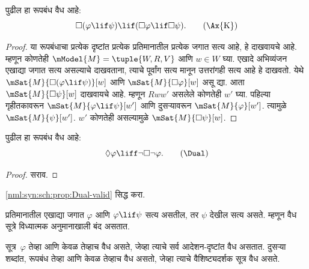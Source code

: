 \begin{prop}\label{nml:syn:sch:prop:Kvalid}
  पुढील  हा रूपबंध वैध आहे:
  \begin{equation*}
  \Box(\varphi \lif \psi) \lif (\Box \varphi \lif \Box \psi). \tag{\Ax{K}}
  \end{equation*}
\end{prop}

\begin{proof}
  या रूपबंधाचा प्रत्येक दृष्टांत प्रत्येक प्रतिमानातील प्रत्येक
  जगात सत्य आहे, हे दाखवायचे आहे. म्हणून कोणतेही
  $\mModel{M} = \tuple{W,R,V}$ आणि $w \in W$ घ्या.
  एखादे अभिव्यंजन एखाद्या जगात सत्य असल्याचे दाखवताना,
  त्याचे पूर्वांग सत्य मानून उत्तरांगही सत्य आहे हे दाखवतो.
  येथे $\mSat{M}{\Box(\varphi \lif \psi)}[w]$ आणि
  $\mSat{M}{\Box \varphi}[w]$ असू द्या. आता
  $\mSat{M}{\Box \psi}[w]$ दाखवायचे आहे. म्हणून $Rww'$
  असलेले कोणतेही $w'$ घ्या. पहिल्या गृहीतकावरून
  $\mSat{M}{\varphi \lif \psi}[w']$ आणि दुसऱ्यावरून
  $\mSat{M}{\varphi}[w']$. त्यामुळे $\mSat{M}{\psi}[w']$.
  $w'$ कोणतेही असल्यामुळे $\mSat{M}{\Box \psi}[w]$.
\end{proof}

\begin{prop}\label{nml:syn:sch:prop:Dual-valid}
  पुढील \Dual{} हा रूपबंध वैध आहे:
  \begin{equation*}
  \Diamond \varphi \liff \lnot\Box\lnot \varphi. \tag{\Dual}
  \end{equation*}
\end{prop}

\begin{proof}
  सराव.
\end{proof}

\begin{prob}
  \ref{nml:syn:sch:prop:Dual-valid} सिद्ध करा.
\end{prob}

\begin{prop}\label{nml:syn:sch:prop:soundMP}
  प्रतिमानातील एखाद्या जगात $\varphi$ आणि $\varphi \lif \psi$ सत्य
  असतील, तर $\psi$ देखील सत्य असते. म्हणून वैध सूत्रे
  विध्यात्मक अनुमानाखाली बंद असतात.
\end{prop}

\begin{prop}\label{nml:syn:sch:prop:valid-instances}
  सूत्र~$\varphi$ तेव्हा आणि केवळ तेव्हाच वैध असते,
  जेव्हा त्याचे सर्व आदेशन-दृष्टांत वैध असतात. दुसऱ्या शब्दांत,
  रूपबंध तेव्हा आणि केवळ तेव्हाच वैध असतो, जेव्हा त्याचे
  वैशिष्ट्यदर्शक सूत्र वैध असते.
\end{prop}

